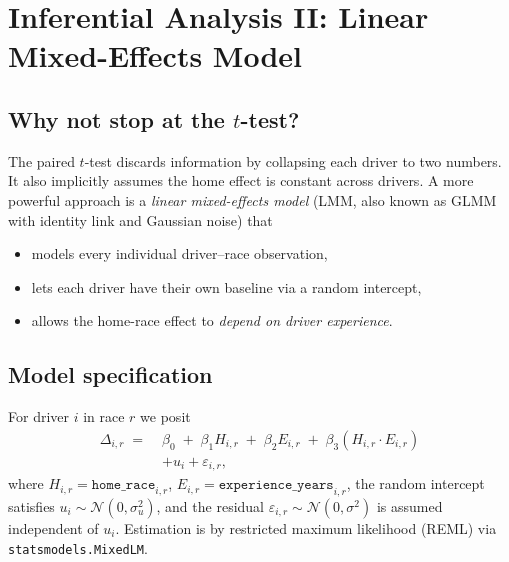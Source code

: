 \documentclass[11pt,a4paper]{article}
\newcommand{\dnorm}{\mathcal{N}}
\newcommand{\code}[1]{\texttt{\small #1}}
\begin{document}
\section{Inferential Analysis II: Linear Mixed-Effects Model}

\subsection{Why not stop at the $t$-test?}
The paired $t$-test discards information by collapsing each driver to two
numbers. It also implicitly assumes the home effect is constant across
drivers. A more powerful approach is a \emph{linear mixed-effects model}
(LMM, also known as GLMM with identity link and Gaussian noise) that

\begin{itemize}[leftmargin=*]
    \item models every individual driver--race observation,
    \item lets each driver have their own baseline via a random intercept,
    \item allows the home-race effect to \emph{depend on driver experience}.
\end{itemize}

\subsection{Model specification}
For driver $i$ in race $r$ we posit
\begin{align}
    \Delta_{i,r}
    \;=\;&
    \beta_0
    \;+\;\beta_1 H_{i,r}
    \;+\;\beta_2 E_{i,r}
    \;+\;\beta_3 (H_{i,r}\!\cdot\! E_{i,r}) \nonumber\\[2pt]
    & + u_i + \varepsilon_{i,r},
    \label{eq:lmm}
\end{align}
where $H_{i,r}=\texttt{home\_race}_{i,r}$, $E_{i,r}=\texttt{experience\_years}_{i,r}$,
the random intercept satisfies $u_i\sim\dnorm(0,\sigma_u^2)$, and the residual
$\varepsilon_{i,r}\sim\dnorm(0,\sigma^2)$ is assumed independent of
$u_i$. Estimation is by restricted maximum likelihood (REML) via
\code{statsmodels.MixedLM}.
\end{document}
